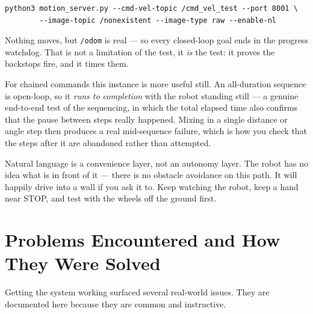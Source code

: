 \documentclass[11pt,a4paper]{article}
\newcommand{\code}[1]{\texttt{#1}}
\newenvironment{warnbox}%
  {\par\medskip\begin{lrbox}{\warnboxsave}%
   \begin{minipage}{\dimexpr\linewidth-2\fboxsep-2\fboxrule\relax}}%
  {\end{minipage}\end{lrbox}%
   \noindent\fcolorbox{warnrule}{warnbg}{\usebox{\warnboxsave}}\par\medskip}
\begin{document}
\begin{lstlisting}[style=bash]
python3 motion_server.py --cmd-vel-topic /cmd_vel_test --port 8001 \
        --image-topic /nonexistent --image-type raw --enable-nl
\end{lstlisting}

\noindent
Nothing moves, but \code{/odom} is real --- so every closed-loop goal ends in the
progress watchdog. That is not a limitation of the test, it \emph{is} the test:
it proves the backstops fire, and it times them.

For chained commands this instance is more useful still. An all-duration
sequence is open-loop, so it \emph{runs to completion} with the robot standing
still --- a genuine end-to-end test of the sequencing, in which the total elapsed
time also confirms that the pause between steps really happened. Mixing in a
single distance or angle step then produces a real mid-sequence failure, which
is how you check that the steps after it are abandoned rather than attempted.

\begin{warnbox}
Natural language is a convenience layer, not an autonomy layer. The robot has no
idea what is in front of it --- there is no obstacle avoidance on this path. It
will happily drive into a wall if you ask it to. Keep watching the robot, keep a
hand near STOP, and test with the wheels off the ground first.
\end{warnbox}

\section{Problems Encountered and How They Were Solved}
\label{sec:fixes}
Getting the system working surfaced several real-world issues. They are
documented here because they are common and instructive.
\end{document}
